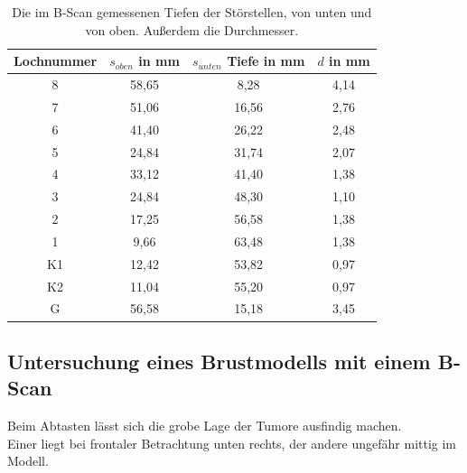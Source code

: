 \begin{table}[H]
    \centering
    \caption{Die im B-Scan gemessenen Tiefen der Störstellen, von unten und von oben. Außerdem die Durchmesser.}
    \begin{tabular}{cccc}
      \toprule
      {Lochnummer} & 
      {$s_{oben}$ in mm} &
      {$s_{unten}$ Tiefe in mm} &
      {$d$ in mm} \\
      \midrule 
      8  &  58,65  &  8,28  &  4,14   \\
      7  &  51,06  & 16,56  &  2,76   \\
      6  &  41,40  & 26,22  &  2,48   \\
      5  &  24,84  & 31,74  &  2,07   \\
      4  &  33,12  & 41,40  &  1,38   \\
      3  &  24,84  & 48,30  &  1,10   \\
      2  &  17,25  & 56,58  &  1,38   \\
      1  &   9,66  & 63,48  &  1,38   \\
      K1 &  12,42  & 53,82  &  0,97   \\
      K2 &  11,04  & 55,20  &  0,97   \\   
      G  &  56,58  & 15,18  &  3,45   \\
      \bottomrule
    \end{tabular}
 \label{tab:bscan_tiefen}
\end{table}
\noindent


\subsection{Untersuchung eines Brustmodells mit einem B-Scan}
Beim Abtasten lässt sich die grobe Lage der Tumore ausfindig machen. \\
Einer liegt bei frontaler Betrachtung unten rechts, der andere ungefähr mittig im Modell.

